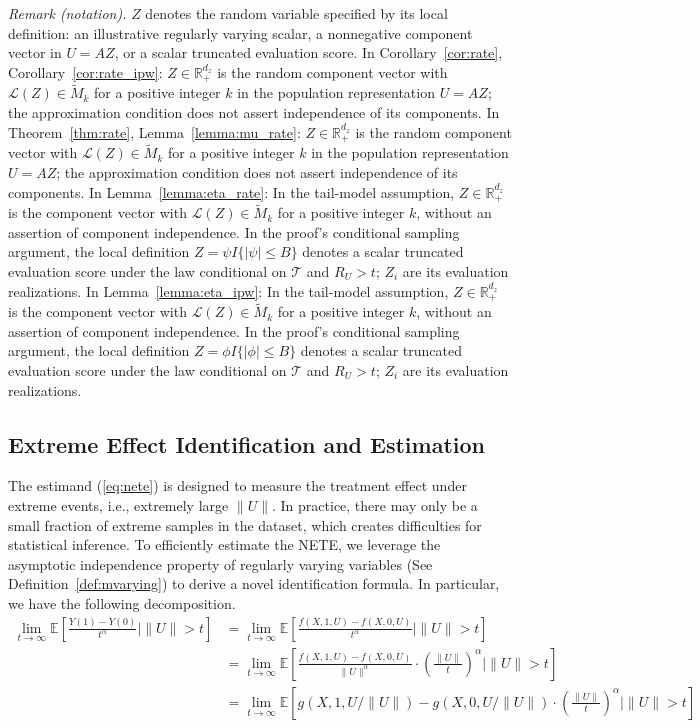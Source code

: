 \documentclass[12pt]{article}
\theoremstyle{plain}
\theoremstyle{definition}
\begin{document}
\noindent\textit{Remark (notation).} $Z$ denotes the random variable specified by its local definition: an illustrative regularly varying scalar, a nonnegative component vector in $U=AZ$, or a scalar truncated evaluation score. In Corollary~\ref{cor:rate}, Corollary~\ref{cor:rate_ipw}: $Z\in\mathbb{R}_+^{d_z}$ is the random component vector with $\mathcal{L}(Z)\in\tilde M_k$ for a positive integer $k$ in the population representation $U=AZ$; the approximation condition does not assert independence of its components. In Theorem~\ref{thm:rate}, Lemma~\ref{lemma:mu_rate}: $Z\in\mathbb R_+^{d_z}$ is the random component vector with $\mathcal L(Z)\in\tilde M_k$ for a positive integer $k$ in the population representation $U=AZ$; the approximation condition does not assert independence of its components. In Lemma~\ref{lemma:eta_rate}: In the tail-model assumption, $Z\in\mathbb R_+^{d_z}$ is the component vector with $\mathcal L(Z)\in\tilde M_k$ for a positive integer $k$, without an assertion of component independence. In the proof's conditional sampling argument, the local definition $Z=\psi I\{|\psi|\leq B\}$ denotes a scalar truncated evaluation score under the law conditional on $\mathcal T$ and $R_U>t$; $Z_i$ are its evaluation realizations. In Lemma~\ref{lemma:eta_ipw}: In the tail-model assumption, $Z\in\mathbb R_+^{d_z}$ is the component vector with $\mathcal L(Z)\in\tilde M_k$ for a positive integer $k$, without an assertion of component independence. In the proof's conditional sampling argument, the local definition $Z=\phi I\{|\phi|\leq B\}$ denotes a scalar truncated evaluation score under the law conditional on $\mathcal T$ and $R_U>t$; $Z_i$ are its evaluation realizations.


\subsection{Extreme Effect Identification and Estimation}

The estimand (\ref{eq:nete}) is designed to measure the treatment effect under extreme events, i.e., extremely large $\|U\|$. In practice, there
may only be a small fraction of extreme samples in the dataset, which creates difficulties for statistical inference. To efficiently estimate the NETE, we leverage the asymptotic independence property of regularly varying variables
(See  Definition~\ref{def:mvarying}) to derive a novel identification formula.
In particular, we have the following decomposition.
\begin{align}
  \lim_{t \rightarrow \infty} \mathbb{E} \left[ \frac{Y (1) - Y
  (0)}{t^{\alpha}} \mid \|U\|> t \right] & = \lim_{t \rightarrow \infty}
  \mathbb{E} \left[ \frac{f (X, 1, U) - f (X, 0, U)}{t^{\alpha}} \mid \|U\|> t
  \right]  \label{eq:naive_id}\\
  & = \lim_{t \rightarrow \infty} \mathbb{E} \left[ \frac{f (X, 1, U) - f (X,
  0, U)}{\|U\|^{\alpha}} \cdot \left( \frac{\|U\|}{t} \right)^{\alpha} \mid
  \|U\|> t \right] \nonumber\\
  & = \lim_{t \rightarrow \infty} \mathbb{E} \left[ g (X, 1, U /\|U\|) - g
  (X, 0, U /\|U\|) \cdot \left( \frac{\|U\|}{t} \right)^{\alpha} \mid \|U\|> t
  \right]  \label{eq:naive_id2}
\end{align}
\end{document}
